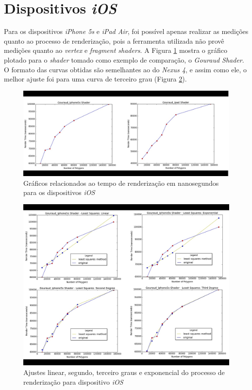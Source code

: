 \section{Dispositivos \textit{iOS}} 

	Para os dispositivos \textit{iPhone 5s} e \textit{iPad Air}, foi possível apenas realizar as medições quanto ao processo de renderização, pois a ferramenta utilizada não provê medições quanto ao \textit{vertex} e \textit{fragment shaders}.  A Figura \ref{ios1} mostra o gráfico plotado para o \textit{shader} tomado como exemplo de comparação, o \textit{Gouraud Shader}. O formato das curvas obtidas são semelhantes ao do \textit{Nexus 4}, e assim como ele, o melhor ajuste foi para uma curva de terceiro grau (Figura \ref{ios1_ajuste}). 

	\begin{figure}[ht]
	\centering
		\includegraphics[keepaspectratio=true,scale=0.35]{figuras/ios_render_time.jpg}
	\caption{Gráficos relacionados ao tempo de renderização em nanosegundos para os dispositivos \textit{iOS}}
	\label{ios1}
	\end{figure}	

	\begin{figure}[ht]
	\centering
		\includegraphics[keepaspectratio=true,scale=0.4]{figuras/ios_minquad_render.jpg}
	\caption{Ajustes linear, segundo, terceiro graus e exponencial do processo de renderização para dispositivo \textit{iOS}}
	\label{ios1_ajuste}
	\end{figure}	

